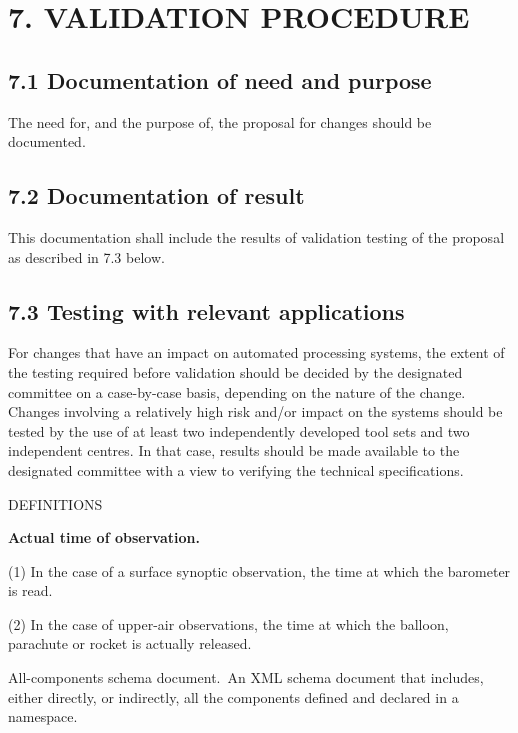 \hypertarget{validation-procedure}{%
\section{7. VALIDATION PROCEDURE}\label{validation-procedure}}

\hypertarget{documentation-of-need-and-purpose}{%
\subsection{7.1 Documentation of need and purpose}\label{documentation-of-need-and-purpose}}

The need for, and the purpose of, the proposal for changes should be documented.

\hypertarget{documentation-of-result}{%
\subsection{7.2 Documentation of result}\label{documentation-of-result}}

This documentation shall include the results of validation testing of the proposal as described in 7.3 below.

\hypertarget{testing-with-relevant-applications}{%
\subsection{7.3 Testing with relevant applications}\label{testing-with-relevant-applications}}

For changes that have an impact on automated processing systems, the extent of the testing required before validation should be decided by the designated committee on a case-by-case basis, depending on the nature of the change. Changes involving a relatively high risk and/or impact on the systems should be tested by the use of at least two independently developed tool sets and two independent centres. In that case, results should be made available to the designated committee with a view to verifying the technical specifications.

DEFINITIONS

\textbf{Actual time of observation.}

(1) In the case of a surface synoptic observation, the time at which the barometer is read.

(2) In the case of upper-air observations, the time at which the balloon, parachute or rocket is actually released.

All-components schema document. An XML schema document that includes, either directly, or indirectly, all the components defined and declared in a namespace.

